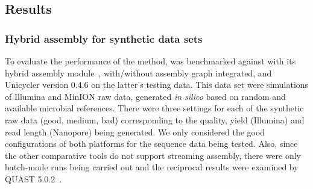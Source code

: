 \subsection{Results}
\subsubsection{Hybrid assembly for synthetic data sets}
To evaluate the performance of the method, \npgraph{} was benchmarked against \spades{} with its hybrid assembly module~\cite{AntipovKM2015}, \npscarf{} with/without assembly graph integrated, and Unicycler \cite{Wick2017unicycler} version 0.4.6 on the latter's testing data. This data set were simulations of Illumina and MinION raw data, generated \emph{in silico} based on random and available microbial references. 
There were three settings for each of the synthetic raw data (good, medium, bad) corresponding to the quality, yield (Illumina) and read length (Nanopore) being generated. 
We only considered the good configurations of both platforms for the sequence data being tested.
Also, since the other comparative tools do not support streaming assembly, there were only batch-mode runs being carried out and the reciprocal results were examined by QUAST 5.0.2~\cite{Mikheenko2018quast5}. 

